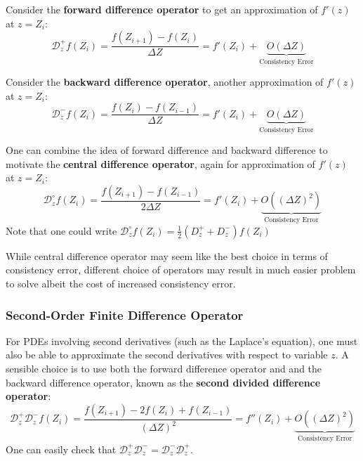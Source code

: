 \documentclass[../dissertation.tex]{subfiles}
\begin{document}
Consider the \textbf{forward difference operator} to get an approximation of $f'(z)$ at $z = Z_i$:
\begin{equation}
    \mathcal{D}_z^+ f \left( Z_i \right) = \frac{f \left( Z_{i+1} \right) - f\left( Z_i \right)}{\Delta Z} = f'\left( Z_i \right) + \underbrace{O \left( \Delta Z \right)}_{\text{Consistency Error}}
\end{equation}

Consider the \textbf{backward difference operator}, another approximation of $f'(z)$ at $z = Z_i$:
\begin{equation}
    \mathcal{D}_z^- f \left( Z_i \right) = \frac{f \left( Z_i \right) - f\left( Z_{i-1} \right)}{\Delta Z} = f'\left( Z_i \right) + \underbrace{O \left( \Delta Z \right)}_{\text{Consistency Error}}
\end{equation}

One can combine the idea of forward difference and backward difference to motivate the \textbf{central difference operator}, again for approximation of $f'(z)$ at $z = Z_i$:
\begin{equation}
    \mathcal{D}_z^\circ f \left( Z_i \right) = \frac{f \left( Z_{i+1} \right) - f\left( Z_{i-1} \right)}{2 \Delta Z} = f'\left( Z_i \right) + \underbrace{O \left( \left( \Delta Z \right)^2 \right)}_{\text{Consistency Error}}
\end{equation}
Note that one could write $\mathcal{D}_z^\circ f \left( Z_i \right) = \frac{1}{2}\left( D_z^+ + D_z^- \right) f \left( Z_i \right) $

While central difference operator may seem like the best choice in terms of consistency error,
different choice of operators may result in much easier problem to solve albeit the cost of increased consistency error.

\subsubsection{Second-Order Finite Difference Operator}
For PDEs involving second derivatives (such as the Laplace's equation), one must also be able to approximate the second derivatives with respect to variable $z$.
A sensible choice is to use both the forward difference operator and and the backward difference operator, known as the \textbf{second divided difference operator}:
\begin{equation}
    \mathcal{D}_z^+ \mathcal{D}_z^- f \left( Z_i \right) = \frac{f \left( Z_{i+1} \right) - 2 f \left( Z_i \right) + f \left( Z_{i-1} \right)}{\left( \Delta Z \right)^2} = f''\left( Z_i \right) + \underbrace{O \left( \left( \Delta Z \right)^2 \right)}_{\text{Consistency Error}}
\end{equation}
One can easily check that $\mathcal{D}_z^+ \mathcal{D}_z^- = \mathcal{D}_z^- \mathcal{D}_z^+$.
\end{document}
